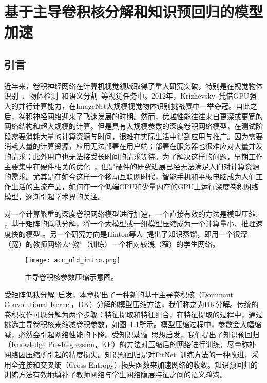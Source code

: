 
\chapter{基于主导卷积核分解和知识预回归的模型加速}
\label{cha:acc}

\section{引言}
\label{sec:acc:introduction}

近年来，卷积神经网络在计算机视觉领域取得了重大研究突破，特别是在视觉物体识别~\cite{krizhevsky2012imagenet}、物体检测~\cite{girshick2014rich}和语义分割~\cite{sermanet2013overfeat}等视觉任务中。2012年，Krizhevsky~\cite{krizhevsky2012imagenet}凭借GPU强大的并行计算能力，在ImageNet大规模视觉物体识别挑战赛中一举夺冠。自此之后，卷积神经网络迎来了飞速发展的时期。然而，优越性能往往来自更深或更宽的网络结构和超大规模的计算。但是具有大规模参数的深度卷积网络模型，在测试阶段需要消耗大量的计算资源与时间，很难在实际生活中得到应用与推广。因为需要消耗大量的计算资源，应用无法部署在用户端；部署在服务器也很难应对大量并发的请求；此外用户也无法接受长时间的请求等待。为了解决这样的问题，早期工作主要集中在硬件相关的优化~\cite{vanhoucke2011improving,farabet2011large,krizhevsky2014one,krizhevsky2012imagenet,jia2014caffe}，但是硬件的研究进展已经无法满足人们对计算资源的需求。尤其是在如今这样一个移动互联网时代，智能手机和平板电脑成为人们工作生活的主流产品，如何在一个低端CPU和少量内存的GPU上运行深度卷积网络模型，逐渐引起学术界的关注。

对一个计算繁重的深度卷积网络模型进行加速，一个直接有效的方法是模型压缩\cite{denil2013predicting,jaderberg2014speeding,denton2014exploiting,lebedev2014speeding,zhang2015efficient}, \cite{jaderberg2014speeding}，基于矩阵的低秩分解，将一个大模型或一组模型压缩成为一个计算量小、推理速度快的模型 。另一个研究方向是Hinton等人~\cite{hinton2015distilling}提出了知识蒸馏，即用一个很深（宽）的教师网络去“教”（训练）一个相对较浅（窄）的学生网络\cite{hinton2015distilling,bucilu2006model,ba2014deep,romero2014fitnets}。

\begin{figure}[t]
\centering
\texttt{[image: acc\_old\_intro.png]}
\caption{主导卷积核参数压缩示意图。}
\label{fig:acc_old_intro}
\end{figure} 

受矩阵低秩分解~\cite{zhang2015efficient}启发，本章提出了一种新的基于主导卷积核（Dominant Convolutional Kernel，DK）分解的模型压缩方法，我们称之为DK分解。传统的卷积操作可以分解为两个步骤：特征提取和特征组合，在特征提取的过程中，通过挑选主导卷积核来缩减卷积参数，如图~\ref{fig:acc_old_intro}所示。模型压缩过程中，参数会大幅缩减，必然会引起网络性能的下降。受知识蒸馏~\cite{hinton2015distilling}思想启发，我们提出了知识预回归（Knowledge Pre-Regression，KP）的方法对压缩后的网络进行训练，尽量弥补网络因压缩所引起的精度损失。知识预回归是对FitNet~\cite{romero2014fitnets}训练方法的一种改进，采用全连接和交叉熵（Cross Entropy）损失函数来加速网络的收敛。知识预回归的训练方法有效地填补了教师网络与学生网络隐层特征之间的语义鸿沟。

